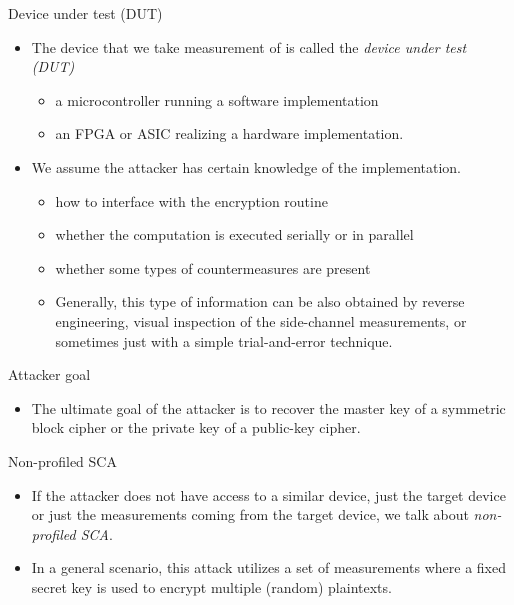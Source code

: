 \begin{frame}{Device under test (DUT)}
    \begin{itemize}
        \item The device that we take measurement of is called the \textit{device under test (DUT)}
        \begin{itemize}
            \item a microcontroller running a software implementation
            \item an FPGA or ASIC realizing a hardware implementation.
        \end{itemize}
       \item We assume the attacker has certain knowledge of the implementation.
       \begin{itemize}
           \item how to interface with the encryption routine
           \item whether the computation is executed serially or in parallel
           \item whether some types of countermeasures are present
           \item Generally, this type of information can be also obtained by reverse engineering, visual inspection of the side-channel measurements, or sometimes just with a simple trial-and-error technique.
       \end{itemize}
    \end{itemize}
\end{frame}

\begin{frame}{Attacker goal}
    \begin{itemize}
        \item The ultimate goal of the attacker is to recover the master key of a symmetric block cipher or the private key of a public-key cipher.
    \end{itemize}
\end{frame}

\begin{frame}{Non-profiled SCA}
    \begin{itemize}
        \item If the attacker does not have access to a similar device, just the target device or just the measurements coming from the target device, we talk about \textit{non-profiled SCA}.
        \item In a general scenario, this attack utilizes a set of measurements where a fixed secret key is used to encrypt multiple (random) plaintexts.
    \end{itemize}
\end{frame}

